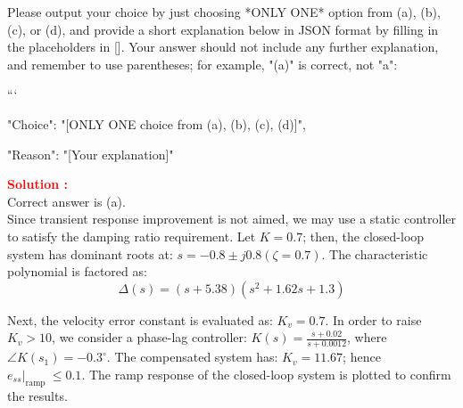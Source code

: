 \documentclass[12pt]{article}
\begin{document}
Please output your choice by just choosing *ONLY ONE* option from (a), (b), (c), or (d), and provide a short explanation below in JSON format by filling in the placeholders in []. Your answer should not include any further explanation, and remember to use parentheses; for example, "(a)" is correct, not "a": 

```
{

"Choice": "[ONLY ONE choice from (a), (b), (c), (d)]",

"Reason": "[Your explanation]"

}


\textbf{\textcolor{red}{Solution :}} \\
Correct answer is (a).\\
Since transient response improvement is not aimed, we may use a static controller to satisfy the damping ratio requirement. Let $K=0.7$; then, the closed-loop system has dominant roots at: $s=-0.8 \pm j 0.8(\zeta=0.7)$. The characteristic polynomial is factored as: 
$$\Delta(s)=(s+5.38)\left(s^2+1.62 s+1.3\right)$$

Next, the velocity error constant is evaluated as: $K_v=0.7$. In order to raise $K_v>10$, we consider a phase-lag controller: $K(s)=\frac{s+0.02}{s+0.0012}$, where $\angle K\left(s_1\right)=-0.3^{\circ}$. The compensated system has: $K_v=11.67$; hence $\left.e_{s s}\right|_{\text {ramp }} \leq 0.1$. The ramp response of the closed-loop system is plotted to confirm the results.
\end{document}
